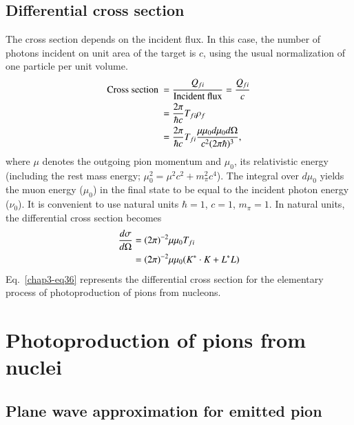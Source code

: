 \subsection{Differential cross section}\label{chap3-sec4.2}

The cross section depends on the incident flux. In this case, the number of photons incident on unit area of the target is $c$, using the usual normalization of one particle per unit volume.
\begin{align}
  \text{Cross section}~ & = \frac{Q_{fi}}{\text{Incident flux}} = \frac{Q_{fi}}{c}\notag \\
  & = \frac{2 \pi}{\hbar c} T_{fi} \rho_ f \notag \\
  & = \frac{2\pi}{\hbar c} T_{fi} \frac{\mu \mu_0 d \mu_0 d \Omega}{c^2 (2 \pi \hbar)^3},\label{chap3-eq35}
\end{align}
where $\mu$ denotes the outgoing pion momentum and $\mu_0$, its relativistic energy (including the rest mass energy; $\mu_0^2 = \mu^2 c^2 + m_\pi^2 c^4$). The integral over $d\mu_0$ yields the muon energy ($\mu_0$) in the final state to be equal to the incident photon energy ($\nu_0$). It is convenient to use natural units $\hbar =1$, $c=1$, $m_\pi =1$. In natural units, the differential cross section becomes
\begin{align}
  \frac{d \sigma}{d \Omega} & = (2 \pi)^{-2} \mu \mu_0 T_{fi}\notag \\
  & = (2 \pi)^{-2} \mu \mu_0 ({\boldmath  K^\ast \cdot K} + L^\ast L) \label{chap3-eq36}
\end{align}
Eq.\ \eqref{chap3-eq36} represents the differential cross section for the elementary process of photoproduction of pions from nucleons.

\section{Photoproduction of pions from nuclei}\label{chap3-sec5}

\subsection{Plane wave approximation for emitted pion}\label{chap3-sec5.1}

